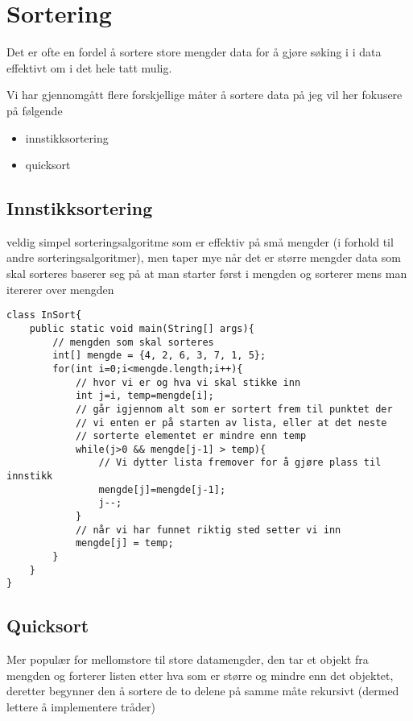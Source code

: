 \documentclass[a4paper,norsk,10pt]{article}
\begin{document}
\section{Sortering}
\label{sec-15}

  Det er ofte en fordel å sortere store mengder data for å gjøre
  søking i i data effektivt om i det hele tatt mulig.

  Vi har gjennomgått flere forskjellige måter å sortere data på
  jeg vil her fokusere på følgende
\begin{itemize}
\item innstikksortering
\item quicksort
\end{itemize}
\subsection{Innstikksortering}
\label{sec-15.1}

   veldig simpel sorteringsalgoritme som er effektiv på små mengder (i forhold til andre
   sorteringsalgoritmer), men taper mye når det er større mengder data som skal sorteres
   baserer seg på at man starter først i mengden og sorterer mens man itererer over mengden

\begin{verbatim}
class InSort{
    public static void main(String[] args){
        // mengden som skal sorteres 
        int[] mengde = {4, 2, 6, 3, 7, 1, 5}; 
        for(int i=0;i<mengde.length;i++){
            // hvor vi er og hva vi skal stikke inn 
            int j=i, temp=mengde[i]; 
            // går igjennom alt som er sortert frem til punktet der 
            // vi enten er på starten av lista, eller at det neste 
            // sorterte elementet er mindre enn temp
            while(j>0 && mengde[j-1] > temp){ 
                // Vi dytter lista fremover for å gjøre plass til innstikk
                mengde[j]=mengde[j-1]; 
                j--;
            }
            // når vi har funnet riktig sted setter vi inn
            mengde[j] = temp;
        }
    }
}
\end{verbatim}
\subsection{Quicksort}
\label{sec-15.2}


   Mer populær for mellomstore til store datamengder, den tar et objekt fra mengden og
   forterer listen etter hva som er større og mindre enn det objektet, deretter begynner
   den å sortere de to delene på samme måte rekursivt (dermed lettere å implementere
   tråder)
\end{document}
